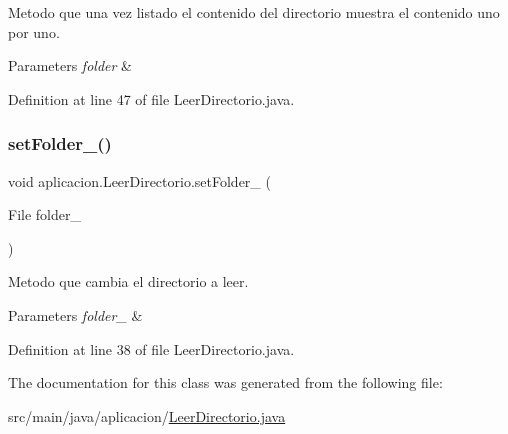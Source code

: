 Metodo que una vez listado el contenido del directorio muestra el contenido uno por uno. 
\begin{DoxyParams}{Parameters}
{\em folder} & \\
\hline
\end{DoxyParams}


Definition at line 47 of file Leer\+Directorio.\+java.

\hypertarget{classaplicacion_1_1_leer_directorio_a42152251cb0eaf44b59e8ea92ebcc165}{}\label{classaplicacion_1_1_leer_directorio_a42152251cb0eaf44b59e8ea92ebcc165} 
\subsubsection{\texorpdfstring{set\+Folder\+\_\+()}{setFolder\_()}}
{\footnotesize\ttfamily void aplicacion.\+Leer\+Directorio.\+set\+Folder\+\_\+ (\begin{DoxyParamCaption}\item[{File}]{folder\+\_\+ }\end{DoxyParamCaption})}

Metodo que cambia el directorio a leer. 
\begin{DoxyParams}{Parameters}
{\em folder\+\_\+} & \\
\hline
\end{DoxyParams}


Definition at line 38 of file Leer\+Directorio.\+java.



The documentation for this class was generated from the following file\+:\begin{DoxyCompactItemize}
\item 
src/main/java/aplicacion/\hyperlink{_leer_directorio_8java}{Leer\+Directorio.\+java}\end{DoxyCompactItemize}
